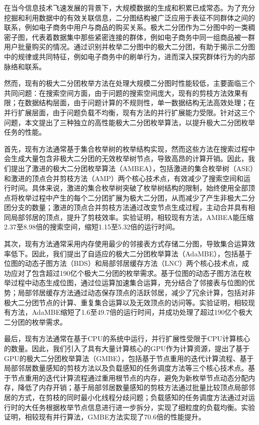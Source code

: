 \cleardoublepage
{}

在当今信息技术飞速发展的背景下，大规模数据的生成和积累已成常态。为了充分挖掘和利用数据中的有效关联信息，二分图结构被广泛应用于表征不同群体之间的联系，例如电子商务中用户与商品的购买关系。极大二分团作为二分图中的一类稠密子图，代表着数据集中那些紧密连接的群体，例如电子商务中同一组商品被一群用户批量购买的情况。通过识别并枚举二分图中的极大二分团，有助于揭示二分图中的规律或共同特征，例如电子商务中的刷单行为，进而深入探究群体行为的内部脉络和联系。

然而，现有的极大二分团枚举方法在处理大规模二分图时性能较低，主要面临三个共同问题：在搜索空间方面，由于问题的搜索空间庞大，现有的剪枝方法效果有限；在数据结构层面，由于问题计算的不规则性，单一数据结构无法高效处理；在并行扩展层面，由于问题负载不均衡，现有方法的并行扩展能力受限。针对这三个问题，本文提出了三种独立的高性能极大二分团枚举算法，以提升极大二分团枚举任务的性能。

首先，现有方法通常基于集合枚举树的枚举结构实现，然而这些方法在搜索过程中会生成大量包含非极大二分团的无效枚举树节点，导致高昂的计算开销。因此，我们提出了激进的极大二分团枚举算法（AMBEA），包括激进的集合枚举树（ASE）和激进的顶点合并剪枝方法（AMP）两个核心技术点，有效减少了搜索空间和运行时间。具体来说，激进的集合枚举树突破了枚举树结构的限制，始终使用全部顶点将枚举过程中产生的每个二分团扩展为极大二分团，从而减少了产生非极大二分团分支的数量；激进的顶点合并剪枝方法通过改变节点生成过程，主动合并具有相同局部邻居的顶点，提升了剪枝效率。实验证明，相较现有方法，AMBEA能压缩2.37至8.98倍的搜索空间，缩短1.15至5.32倍的运行时间。

其次，现有方法通常采用内存使用最少的邻接表方式存储二分图，导致集合运算效率低下。因此，我们提出了自适应的极大二分团枚举算法（AdaMBE），包括基于位图的动态子图方法（BDS）和局部邻居缓存方法（LNC）两个核心技术点，成功应对了包含超过190亿个极大二分团的枚举需求。基于位图的动态子图方法在枚举过程中动态生成位图，通过位运算加速集合运算，充分结合了邻接表与位图的优势；局部邻居缓存方法通过动态保存顶点的活跃邻居，减少了冗余计算，包括对非极大二分团节点的计算、重复集合运算以及无效顶点的访问等。实验证明，相较现有方法，AdaMBE缩短了1.6至49.7倍的运行时间，并成功处理了超过190亿个极大二分团的枚举需求。

最后，现有方法通常在基于CPU的系统中运行，并行扩展性受限于CPU计算核心的数量。因此，我们引入了具有大量计算核心的GPU作为计算资源，提出了基于GPU的极大二分团枚举算法（GMBE），包括基于节点重用的迭代计算流程、基于局部邻居数量感知的剪枝方法以及负载感知的任务调度方法等三个核心技术点。基于节点重用的迭代计算流程通过重用根节点的内存，避免为新枚举节点动态分配内存，降低了内存开销；基于局部邻居数量感知的剪枝方法通过批量比较顶点局部邻居的方式，在剪枝的同时最小化线程分歧问题；负载感知的任务调度方法通过对运行时的大任务根据枚举节点信息进行进一步拆分，实现了细粒度的负载均衡。实验证明，相较现有并行算法，GMBE方法实现了70.6倍的性能提升。

